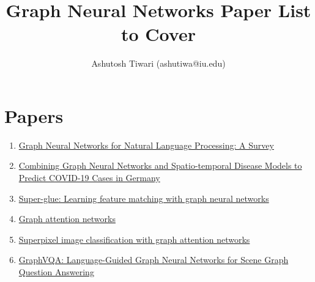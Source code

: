 \documentclass{article}
\title{\textbf{Graph Neural Networks Paper List to Cover}}
\author{{Ashutosh Tiwari (ashutiwa@iu.edu)}}
\begin{document}
\maketitle

\section{Papers}
\begin{enumerate}
    \item \href{https://arxiv.org/pdf/2106.06090.pdf}{Graph Neural Networks for Natural Language Processing: A Survey}
    \item \href{https://arxiv.org/pdf/2101.00661.pdf}{Combining Graph Neural Networks and Spatio-temporal Disease Models to Predict COVID-19 Cases in Germany}
    \item \href{https://arxiv.org/pdf/1911.11763.pdf}{Super-glue: Learning feature matching with graph neural networks}
    \item \href{https://arxiv.org/pdf/1710.10903.pdf}{Graph attention networks}
    \item \href{https://arxiv.org/pdf/2002.05544.pdf}{Superpixel image classification with graph attention networks}
    \item \href{https://arxiv.org/pdf/2104.10283.pdf}{GraphVQA: Language-Guided Graph Neural Networks for Scene Graph Question Answering}

\end{enumerate}

\end{document}
